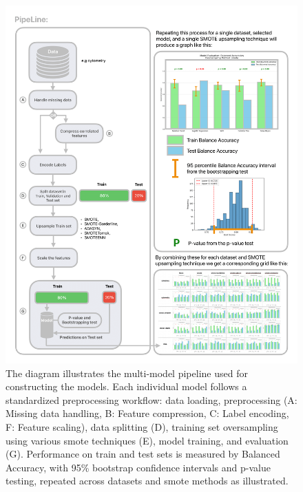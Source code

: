 \documentclass[12pt,a4paper]{report}
\begin{document}
\pagebreak
\begin{figure}[H]
  \centering
  \hspace*{-0.9cm} %
  \includegraphics[width=1.1\textwidth]{images/Pipeline-2.png} %
  \caption[Feature Identification models pipeline diagram]{ The diagram illustrates the multi-model pipeline used for constructing the models.  Each individual model follows a standardized preprocessing workflow: data loading, preprocessing (A: Missing data handling, B: Feature compression, C: Label encoding, F: Feature scaling), data splitting (D), training set oversampling using various \gls{smote} techniques (E), model training, and evaluation (G). Performance on train and test sets is measured by Balanced Accuracy, with 95\% bootstrap confidence intervals and p-value testing, repeated across datasets and \gls{smote} methods as illustrated.}
  \label{fig:pipeline-2}
\end{figure}
\end{document}
